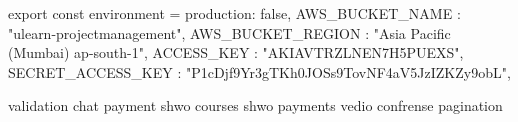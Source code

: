 export const environment = {
  production: false,
  AWS_BUCKET_NAME : "ulearn-projectmanagement",
  AWS_BUCKET_REGION : "Asia Pacific (Mumbai) ap-south-1",
  ACCESS_KEY : "AKIAVTRZLNEN7H5PUEXS",
  SECRET_ACCESS_KEY : "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",
 }
  


 validation
 chat
 payment
 shwo courses
 shwo payments
 vedio confrense
 pagination